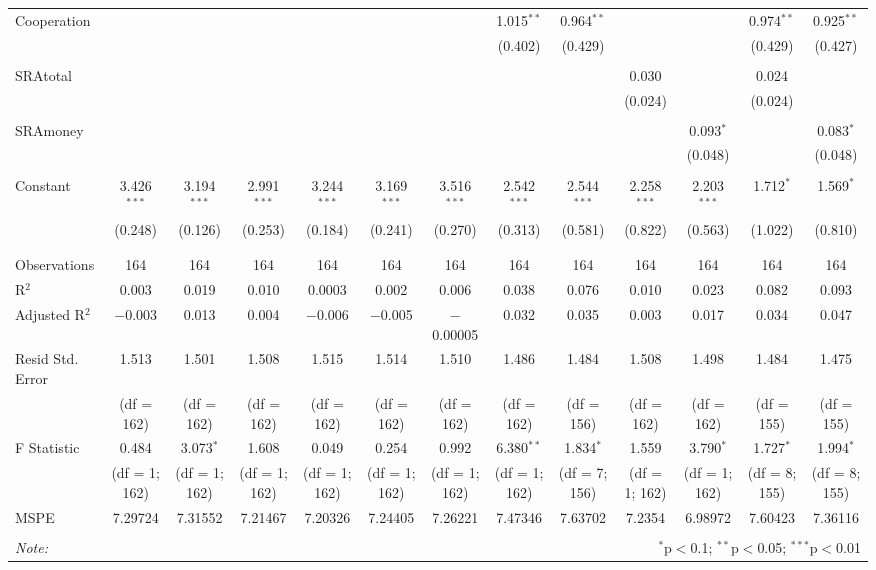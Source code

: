 \begin{table}[H]
\begin{adjustbox}{width=\textwidth}
\begin{tabular}{@{\extracolsep{5pt}}lcccccccccccc}
 Cooperation &  &  &  &  &  &  & 1.015$^{**}$ & 0.964$^{**}$ &  &  & 0.974$^{**}$ & 0.925$^{**}$ \\ 
  &  &  &  &  &  &  & (0.402) & (0.429) &  &  & (0.429) & (0.427) \\ 
  & & & & & & & & & & & & \\ 
 SRAtotal &  &  &  &  &  &  &  &  & 0.030 &  & 0.024 &  \\ 
  &  &  &  &  &  &  &  &  & (0.024) &  & (0.024) &  \\ 
  & & & & & & & & & & & & \\ 
 SRAmoney &  &  &  &  &  &  &  &  &  & 0.093$^{*}$ &  & 0.083$^{*}$ \\ 
  &  &  &  &  &  &  &  &  &  & (0.048) &  & (0.048) \\ 
  & & & & & & & & & & & & \\ 
 Constant & 3.426$^{***}$ & 3.194$^{***}$ & 2.991$^{***}$ & 3.244$^{***}$ & 3.169$^{***}$ & 3.516$^{***}$ & 2.542$^{***}$ & 2.544$^{***}$ & 2.258$^{***}$ & 2.203$^{***}$ & 1.712$^{*}$ & 1.569$^{*}$ \\ 
  & (0.248) & (0.126) & (0.253) & (0.184) & (0.241) & (0.270) & (0.313) & (0.581) & (0.822) & (0.563) & (1.022) & (0.810) \\ 
  & & & & & & & & & & & & \\ 
\hline \\[-1.8ex] 
Observations & 164 & 164 & 164 & 164 & 164 & 164 & 164 & 164 & 164 & 164 & 164 & 164 \\ 
R$^{2}$ & 0.003 & 0.019 & 0.010 & 0.0003 & 0.002 & 0.006 & 0.038 & 0.076 & 0.010 & 0.023 & 0.082 & 0.093 \\ 
Adjusted R$^{2}$ & $-$0.003 & 0.013 & 0.004 & $-$0.006 & $-$0.005 & $-$0.00005 & 0.032 & 0.035 & 0.003 & 0.017 & 0.034 & 0.047 \\ 
Resid Std. Error & 1.513 & 1.501 & 1.508 & 1.515  & 1.514 & 1.510 & 1.486  & 1.484 & 1.508 & 1.498 & 1.484  & 1.475\\ 
& (df = 162) & (df = 162) & (df = 162) & (df = 162) & (df = 162) & (df = 162) & (df = 162) & (df = 156) & (df = 162) & (df = 162) & (df = 155) & (df = 155) \\
F Statistic & 0.484  & 3.073$^{*}$  & 1.608  & 0.049  & 0.254 & 0.992  & 6.380$^{**}$  & 1.834$^{*}$  & 1.559  & 3.790$^{*}$ & 1.727$^{*}$  & 1.994$^{*}$  \\ 
& (df = 1; 162) & (df = 1; 162) & (df = 1; 162) & (df = 1; 162) & (df = 1; 162) & (df = 1; 162) & (df = 1; 162) & (df = 7; 156) & (df = 1; 162) & (df = 1; 162)  & (df = 8; 155) & (df = 8; 155) \\
MSPE & 7.29724 & 7.31552 & 7.21467 & 7.20326 & 7.24405 & 7.26221 & 7.47346 &7.63702 & 7.2354 & 6.98972 & 7.60423 & 7.36116 \\
\hline 
\hline \\[-1.8ex] 
\textit{Note:}  & \multicolumn{12}{r}{$^{*}$p$<$0.1; $^{**}$p$<$0.05; $^{***}$p$<$0.01} \\ 
\end{tabular} 
\end{adjustbox}
\end{table} 

